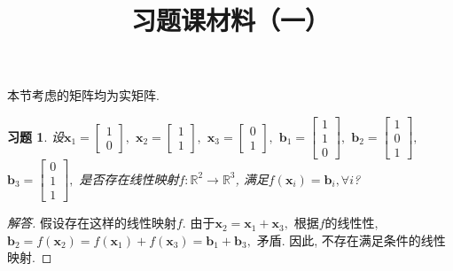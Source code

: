 \documentclass[UTF8]{ctexart}
\newcommand\bs[1]{\boldsymbol{ #1}}
\newtheorem{ex}[thm]{习题}
\begin{document}
\title{习题课材料（一）}

\date{}

\maketitle

\vspace{-1cm}




\medskip

本节考虑的矩阵均为实矩阵.





\begin{ex}
设$\bs x_1 = \begin{bmatrix}
				1 \\ 0
			\end{bmatrix},$ $\bs x_2 = \begin{bmatrix}
				1 \\ 1
			\end{bmatrix},$ $\bs x_3 = \begin{bmatrix}
				0 \\ 1
			\end{bmatrix},$ $\bs b_1 = \begin{bmatrix}
				1 \\ 1\\ 0
			\end{bmatrix},$ $\bs b_2 = \begin{bmatrix}
				1 \\ 0\\ 1
			\end{bmatrix},$ $\bs b_3 = \begin{bmatrix}
				0 \\ 1\\ 1
			\end{bmatrix},$ 是否存在线性映射$f:\mathbb{R}^2 \to \mathbb{R}^3$, 满足$f (\bs x_i) = \bs b_i, \forall i$?
\end{ex}
\begin{proof}[解答]
假设存在这样的线性映射$f.$ 由于$\bs x_2 = \bs x_1 + \bs x_3,$ 根据$f$的线性性, $\bs b_2 = f(\bs x_2) = f (\bs x_1) + f(\bs x_3) =\bs b_1 + \bs b_3,$ 矛盾. 因此, 不存在满足条件的线性映射.
\end{proof}
\end{document}
